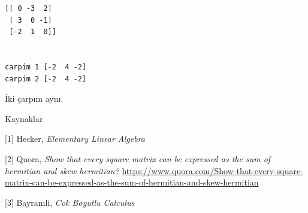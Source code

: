 \documentclass[12pt,fleqn]{article}\usepackage{../../common}
\begin{document}
\begin{verbatim}
[[ 0 -3  2]
 [ 3  0 -1]
 [-2  1  0]]


carpim 1 [-2  4 -2]
carpim 2 [-2  4 -2]
\end{verbatim}

İki çarpım aynı.


Kaynaklar

[1] Hecker, {\em Elementary Linear Algebra}

[2] Quora, {\em Show that every square matrix can be expressed as the sum of hermitian and skew hermitian?}
    \url{https://www.quora.com/Show-that-every-square-matrix-can-be-expressed-as-the-sum-of-hermitian-and-skew-hermitian}

[3] Bayramli, {\em Cok Boyutlu Calculus}
    
\end{document}
